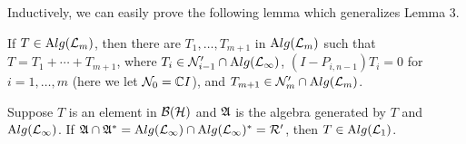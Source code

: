 Inductively, we can easily prove the following lemma which
generalizes Lemma 3.

\begin{lemma}
If $T\in\mathrm Alg(\mathcal L_m)$, then
there are $T_1,\ldots, T_{m+1}$ in $\mathrm Alg(\mathcal L_m)$ such that
$T=T_1+\cdots +T_{m+1}$, where
$T_i\in\mathcal N_{i-1}'\cap\mathrm Alg(\mathcal L_\infty)$, $(I-P_{i,n-1})T_i=0$ for
$i=1,\ldots, m$ (here we let $\mathcal N_0=\mathbb C I$), and
$T_{m+1}\in\mathcal N_m'\cap\mathrm Alg(\mathcal L_m)$.
\end{lemma}


\begin{lemma}
Suppose $T$ is an element
in $\mathcal B(\mathcal H)$ and $\mathfrak A$ is the algebra generated by $T$ and
$\mathrm Alg(\mathcal L_\infty)$. If $\mathfrak A\cap\mathfrak A^*=\mathrm Alg(\mathcal L_\infty)
\cap\mathrm Alg(\mathcal L_\infty)^* =\mathcal R'$, then $T\in\mathrm Alg(\mathcal L_1)$.
\end{lemma}

